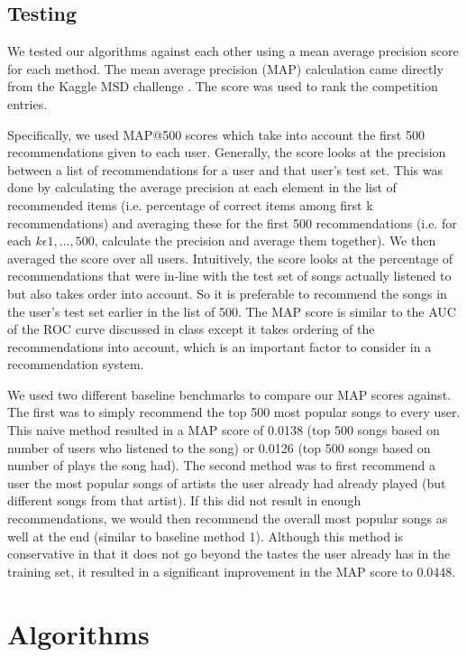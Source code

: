 \documentclass[12pt,preprint]{aastex}
\begin{document}
\subsection{Testing}
We tested our algorithms against each other using a mean average precision 
score for each method.  The mean average precision (MAP) calculation came directly from the Kaggle MSD challenge \citep{kaggleMSD}. The score was used to rank the competition entries.

Specifically, we used MAP@500 scores which take into account the first 500 recommendations given to each user. Generally, the score looks at the precision between a list of recommendations for a user and that user's test set. This was done by calculating the average precision at each element in the list of recommended items (i.e. percentage of correct items among first k recommendations) and averaging these for the first 500 recommendations (i.e. for each $k \epsilon {1, ..., 500}$, calculate the precision and average them together).
We then averaged the score over all users. Intuitively, the score looks at the percentage of recommendations that were in-line with the test set of songs actually listened to but also takes order into account. So it is preferable to recommend the songs in the user's test set earlier in the list of 500. The MAP score is similar to the AUC of the ROC curve discussed in class except it takes ordering of the recommendations into account, which is an important factor to consider in a recommendation system.

We used two different baseline benchmarks to compare our MAP scores against. The first was to simply recommend the top 500 most popular songs to every user. This naive method resulted in a MAP score of 0.0138 (top 500 songs based on number of users who listened to the song) or 0.0126 (top 500 songs based on number of plays the song had). The second method was to first recommend a user the most popular songs of artists the user already had already played (but different songs from that artist). If this did not result in enough recommendations, we would then recommend the overall most popular songs as well at the end (similar to baseline method 1). Although this method is conservative in that it does not go beyond the tastes the user already has in the training set, it resulted in a significant improvement in the MAP score to 0.0448.




\section{Algorithms}
\end{document}
